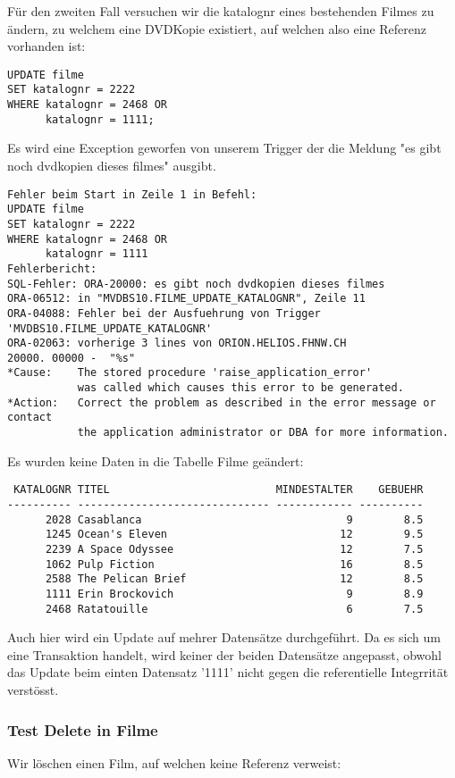 \documentclass[11pt,a4paper,parskip=half]{scrartcl}
\begin{document}
Für den zweiten Fall versuchen wir die katalognr eines bestehenden Filmes zu ändern, zu welchem eine DVDKopie existiert, auf welchen also eine Referenz vorhanden ist:

\begin{lstlisting}
UPDATE filme
SET katalognr = 2222
WHERE katalognr = 2468 OR 
      katalognr = 1111;
\end{lstlisting}

Es wird eine Exception geworfen von unserem Trigger der die Meldung "es gibt noch dvdkopien dieses filmes" ausgibt.

\begin{lstlisting}
Fehler beim Start in Zeile 1 in Befehl:
UPDATE filme
SET katalognr = 2222
WHERE katalognr = 2468 OR 
      katalognr = 1111
Fehlerbericht:
SQL-Fehler: ORA-20000: es gibt noch dvdkopien dieses filmes
ORA-06512: in "MVDBS10.FILME_UPDATE_KATALOGNR", Zeile 11
ORA-04088: Fehler bei der Ausfuehrung von Trigger 'MVDBS10.FILME_UPDATE_KATALOGNR'
ORA-02063: vorherige 3 lines von ORION.HELIOS.FHNW.CH
20000. 00000 -  "%s"
*Cause:    The stored procedure 'raise_application_error'
           was called which causes this error to be generated.
*Action:   Correct the problem as described in the error message or contact
           the application administrator or DBA for more information.
\end{lstlisting}

Es wurden keine Daten in die Tabelle Filme geändert:

\begin{lstlisting}
 KATALOGNR TITEL                          MINDESTALTER    GEBUEHR
---------- ------------------------------ ------------ ----------
      2028 Casablanca                                9        8.5 
      1245 Ocean's Eleven                           12        9.5 
      2239 A Space Odyssee                          12        7.5 
      1062 Pulp Fiction                             16        8.5 
      2588 The Pelican Brief                        12        8.5 
      1111 Erin Brockovich                           9        8.9 
      2468 Ratatouille                               6        7.5 
\end{lstlisting}

Auch hier wird ein Update auf mehrer Datensätze durchgeführt. Da es sich um eine Transaktion handelt, wird keiner der beiden Datensätze angepasst, obwohl das Update beim einten Datensatz '1111' nicht gegen die referentielle Integrrität verstösst.

\subsubsection{Test Delete in Filme}
Wir löschen einen Film, auf welchen keine Referenz verweist:
\end{document}
